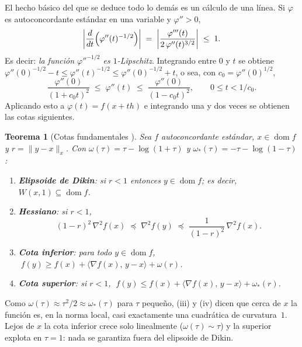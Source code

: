 \documentclass[11pt,a4paper,oneside]{book}
\newtheorem{teorema}{Teorema}[chapter]
\theoremstyle{definition}
\theoremstyle{remark}
\newcommand{\nrm}[1]{\lVert #1\rVert}
\newcommand{\abs}[1]{\left\lvert #1\right\rvert}
\newcommand{\ip}[2]{\langle #1,\, #2\rangle}
\DeclareMathOperator{\dom}{dom}
\begin{document}
El hecho básico del que se deduce todo lo demás es un cálculo de una línea. Si $\varphi$ es autoconcordante
estándar en una variable y $\varphi''>0$,
\begin{equation}\label{eq:sc-clave}
  \abs{\frac{d}{dt}\Bigl(\varphi''(t)^{-1/2}\Bigr)}\;=\;\abs{\frac{\varphi'''(t)}{2\,\varphi''(t)^{3/2}}}\;\le\;1 .
\end{equation}
Es decir: \emph{la función $\varphi''^{-1/2}$ es $1$-Lipschitz}. Integrando entre $0$ y $t$ se obtiene
$\varphi''(0)^{-1/2}-t\le\varphi''(t)^{-1/2}\le\varphi''(0)^{-1/2}+t$, o sea, con $c_0=\varphi''(0)^{1/2}$,
\begin{equation}\label{eq:sc-hess-1d}
  \frac{\varphi''(0)}{(1+c_0t)^2}\;\le\;\varphi''(t)\;\le\;\frac{\varphi''(0)}{(1-c_0t)^2},
  \qquad 0\le t<1/c_0 .
\end{equation}
Aplicando esto a $\varphi(t)=f(x+th)$ e integrando una y dos veces se obtienen las cotas siguientes.

\begin{teorema}[Cotas fundamentales {\cite[§5.1]{Nesterov}}]\label{teo:sc-cotas}
Sea $f$ autoconcordante estándar, $x\in\dom f$ y $r=\nrm{y-x}_x$. Con
$\omega(\tau)=\tau-\log(1+\tau)$ y $\omega_*(\tau)=-\tau-\log(1-\tau)$:
\begin{enumerate}[label=(\roman*)]
  \item \textbf{Elipsoide de Dikin}: si $r<1$ entonces $y\in\dom f$; es decir, $W(x,1)\subseteq\dom f$.
  \item \textbf{Hessiano}: si $r<1$,
  \begin{equation}\label{eq:sc-hess}
    (1-r)^2\,\nabla^2 f(x)\;\preceq\;\nabla^2 f(y)\;\preceq\;\frac{1}{(1-r)^2}\,\nabla^2 f(x).
  \end{equation}
  \item \textbf{Cota inferior}: para todo $y\in\dom f$, $\;f(y)\ge f(x)+\ip{\nabla f(x)}{y-x}+\omega(r)$.
  \item \textbf{Cota superior}: si $r<1$, $\;f(y)\le f(x)+\ip{\nabla f(x)}{y-x}+\omega_*(r)$.
\end{enumerate}
\end{teorema}

Como $\omega(\tau)\approx\tau^2/2\approx\omega_*(\tau)$ para $\tau$ pequeño, (iii) y (iv) dicen que cerca de $x$ la
función es, en la norma local, casi exactamente una cuadrática de curvatura~$1$. Lejos de $x$ la cota
inferior crece solo linealmente ($\omega(\tau)\sim\tau$) y la superior explota en $\tau=1$: nada se garantiza
fuera del elipsoide de Dikin.
\end{document}
